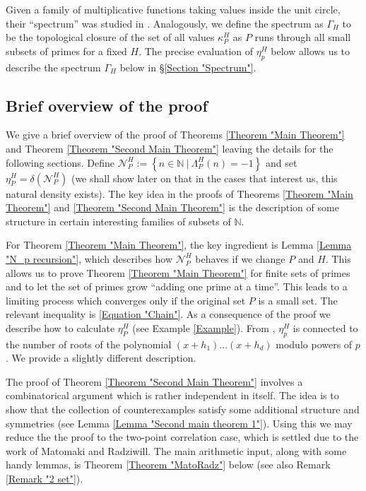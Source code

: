 \documentclass[12pt, a4paper]{amsart}
\theoremstyle{remark}
\theoremstyle{proof}
\numberwithin{equation}{section}
\numberwithin{assumption}{section}
\newcommand{\N}{\mathbb{N}}
\begin{document}
	Given a family of multiplicative functions taking values inside the unit circle, their ``spectrum'' was studied in \cite{SoundSpectrum}. Analogously, we define the spectrum as $\Gamma_H$ to be the topological closure of the set of all values $\kappa_P^H$ as $P$ runs through all small subsets of primes for a fixed $H$. The precise evaluation of $\eta_p^H$ below allows us to describe the spectrum $\Gamma_H$ below in \S\ref{Section "Spectrum"}.
	
	\subsection{Brief overview of the proof}
	
	We give a brief overview of the proof of Theorems \ref{Theorem "Main Theorem"} and Theorem \ref{Theorem "Second Main Theorem"} leaving the details for the following sections. Define $	\mathcal{N}_P^H := \left\{ n\in\N\ |\ \Lambda_P^H(n) = -1 \right\}$	and set $\eta_P^H = \delta\left(\mathcal{N}_{P}^H\right)$ (we shall show later on that in the cases that interest us, this natural density exists).  The key idea in the proofs of Theorems \ref{Theorem "Main Theorem"} and \ref{Theorem "Second Main Theorem"} is the description of some structure in certain interesting families of subsets of $\N$.
	
	For Theorem \ref{Theorem "Main Theorem"}, the key ingredient is Lemma \ref{Lemma "N_p recursion"}, which describes how $\mathcal{N}_P^H$ behaves if we change $P$ and $H$. This allows us to prove Theorem \ref{Theorem "Main Theorem"} for finite sets of primes and to let the set of primes grow ``adding one prime at a time''. This leads to a limiting process which converges only if the original set $P$ is a small set. The relevant inequality is \eqref{Equation "Chain"}. As a consequence of the proof we describe how to calculate $\eta_P^H$ (see Example \ref{Example}). From \cite{Klurman}, $\eta_p^H$ is connected to the number of roots of the polynomial $(x+h_1)\ldots(x+h_d)$ modulo powers of $p$. We provide a slightly different description.
	
	The proof of Theorem \ref{Theorem "Second Main Theorem"} involves a combinatorical argument which is rather independent in itself. The idea is to show that the collection of counterexamples satisfy some additional structure and symmetries (see Lemma \ref{Lemma "Second main theorem 1"}). Using this we may reduce the the proof to the two-point correlation case, which is settled due to the work of Matomaki and Radziwill. The main arithmetic input, along with some handy lemmas, is Theorem \ref{Theorem "MatoRadz"} below (see also Remark \ref{Remark "2 set"}).
	
\end{document}
